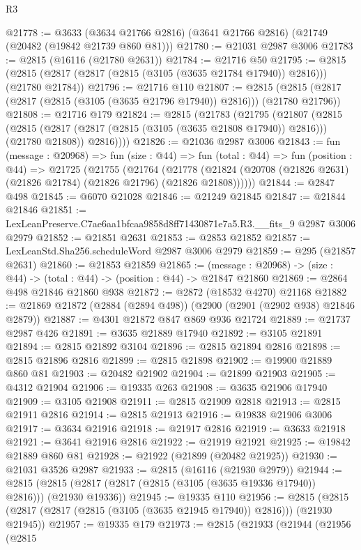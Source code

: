 \begin{lexlean}{R3}
\begin{coremodule}
@21778 := @3633 (@3634 @21766 @2816) (@3641 @21766 @2816) (@21749 (@20482 (@19842 @21739 @860 @81)))
@21780 := @21031 @2987 @3006
@21783 := @2815 (@16116 (@21780 @2631))
@21784 := @21716 @50
@21795 := @2815 (@2815 (@2817 (@2817 (@2815 (@3105 (@3635 @21784 @17940)) @2816))) (@21780 @21784))
@21796 := @21716 @110
@21807 := @2815 (@2815 (@2817 (@2817 (@2815 (@3105 (@3635 @21796 @17940)) @2816))) (@21780 @21796))
@21808 := @21716 @179
@21824 := @2815
    (@21783
      (@21795
        (@21807
          (@2815
            (@2815 (@2817 (@2817 (@2815 (@3105 (@3635 @21808 @17940)) @2816))) (@21780 @21808))
            @2816))))
@21826 := @21036 @2987 @3006
@21843 := fun (message : @20968) =>
  fun (size : @44) =>
  fun (total : @44) =>
  fun (position : @44) =>
  @21725
    (@21755
      (@21764
        (@21778 (@21824 (@20708 (@21826 @2631) (@21826 @21784) (@21826 @21796) (@21826 @21808))))))
@21844 := @2847 @498
@21845 := @6070 @21028
@21846 := @21249 @21845
@21847 := @21844 @21846
@21851 := LexLeanPreserve.C7ae6aa1bfcaa9858d8ff71430871e7a5.R3.__fits_9 @2987 @3006 @2979
@21852 := @21851 @2631
@21853 := @2853 @21852
@21857 := LexLeanStd.Sha256.scheduleWord @2987 @3006 @2979
@21859 := @295 (@21857 @2631)
@21860 := @21853 @21859
@21865 := (message : @20968) -> (size : @44) -> (total : @44) -> (position : @44) -> @21847 @21860
@21869 := @2864 @498 @21846 @21860 @938
@21872 := @2872 (@18532 @4270) @21168
@21882 := @21869 @21872 (@2884 (@2894 @498)) (@2900 (@2901 (@2902 @938) @21846 @2879))
@21887 := @4301 @21872 @847 @869 @936 @21724
@21889 := @21737 @2987 @426
@21891 := @3635 @21889 @17940
@21892 := @3105 @21891
@21894 := @2815 @21892 @3104
@21896 := @2815 @21894 @2816
@21898 := @2815 @21896 @2816
@21899 := @2815 @21898
@21902 := @19900 @21889 @860 @81
@21903 := @20482 @21902
@21904 := @21899 @21903
@21905 := @4312 @21904
@21906 := @19335 @263
@21908 := @3635 @21906 @17940
@21909 := @3105 @21908
@21911 := @2815 @21909 @2818
@21913 := @2815 @21911 @2816
@21914 := @2815 @21913
@21916 := @19838 @21906 @3006
@21917 := @3634 @21916
@21918 := @21917 @2816
@21919 := @3633 @21918
@21921 := @3641 @21916 @2816
@21922 := @21919 @21921
@21925 := @19842 @21889 @860 @81
@21928 := @21922 (@21899 (@20482 @21925))
@21930 := @21031 @3526 @2987
@21933 := @2815 (@16116 (@21930 @2979))
@21944 := @2815 (@2815 (@2817 (@2817 (@2815 (@3105 (@3635 @19336 @17940)) @2816))) (@21930 @19336))
@21945 := @19335 @110
@21956 := @2815 (@2815 (@2817 (@2817 (@2815 (@3105 (@3635 @21945 @17940)) @2816))) (@21930 @21945))
@21957 := @19335 @179
@21973 := @2815
    (@21933
      (@21944
        (@21956
          (@2815

\end{coremodule}
\end{lexlean}
